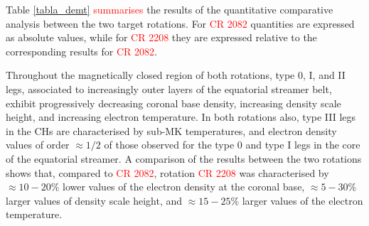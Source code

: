 \documentclass[namedreferences]{solarphysics}
\def\edit#1{\textcolor{Red}{#1}}
\begin{document}
\begin{article}
Table \ref{tabla_demt} \edit{summarises} {the results of the quantitative comparative analysis between the two {target rotations}}. For \edit{CR 2082} quantities are expressed as absolute values, {while} for \edit{CR 2208} they are expressed relative to the corresponding results for \edit{CR 2082}.

{Throughout the magnetically closed region of both rotations, type 0, I, and II legs, associated to  increasingly outer layers of the equatorial streamer belt, exhibit progressively decreasing coronal base density, increasing density scale height, and increasing electron temperature. In both rotations also, type III legs in the CHs are characterised by sub-MK temperatures, and electron density values of order $\approx 1/2$ of those observed for the type 0 and type I legs in the core of the equatorial streamer.} {A comparison of the results between the two rotations shows that, compared to \edit{CR 2082}, rotation \edit{CR 2208} was characterised by {$\approx 10-20\%$} lower values of the electron density at the coronal base, $\approx 5-30\%$ larger values of density scale height, and {$\approx 15-25\%$} larger values of the electron temperature.} 


\end{article}
\end{document}

